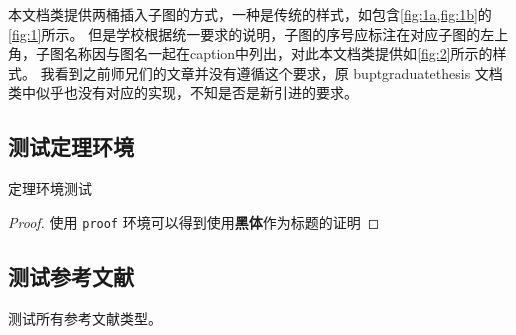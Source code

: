 本文档类提供两桶插入子图的方式，一种是传统的样式，如包含\cref{fig:1a,fig:1b}的\cref{fig:1}所示。
但是学校根据统一要求的说明，子图的序号应标注在对应子图的左上角，子图名称因与图名一起在caption中列出，对此本文档类提供如\cref{fig:2}所示的样式。
我看到之前师兄们的文章并没有遵循这个要求，原 buptgraduatethesis 文档类中似乎也没有对应的实现，不知是否是新引进的要求。

\subsection{测试定理环境}
\begin{theorem}[定理名称]
    定理环境测试
\end{theorem}

\begin{proof}
    使用 \texttt{proof} 环境可以得到使用\textbf{黑体}作为标题的证明
\end{proof}

\subsection{测试参考文献}
测试所有参考文献类型\cite{CITATION_BOOK,CITATION_ARTICLE,CITATION_PROCEEDINGS,CITATION_INPROCEEDINGS,CITATION_TECHREPORT,CITATION_STANDARD,CITATION_PATENT,CITATION_NEWSPAPER,CITATION_ELECTRONIC}。

